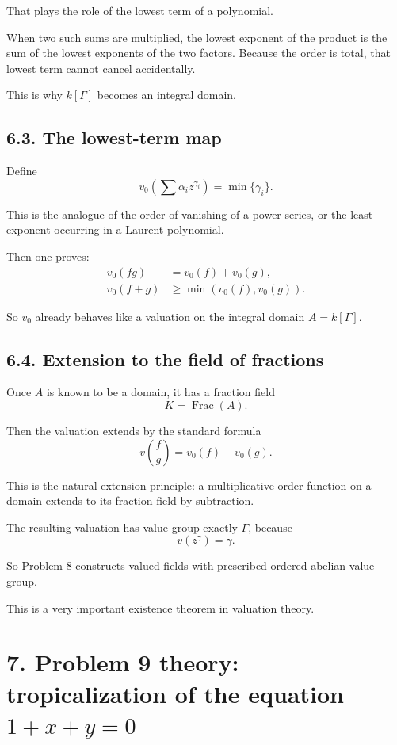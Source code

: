 \documentclass[12pt,a4paper]{article}
\theoremstyle{plain}
\theoremstyle{definition}      %
\begin{document}
That plays the role of the lowest term of a polynomial.

When two such sums are multiplied, the lowest exponent of the product is the sum of the lowest exponents of the two factors. Because the order is total, that lowest term cannot cancel accidentally.

This is why \(k[\Gamma]\) becomes an integral domain.

\subsection*{6.3. The lowest-term map}

Define
\[
v_0\left(\sum \alpha_i z^{\gamma_i}\right)=\min\{\gamma_i\}.
\]

This is the analogue of the order of vanishing of a power series, or the least exponent occurring in a Laurent polynomial.

Then one proves:
\begin{align*}
	v_0(fg)&=v_0(f)+v_0(g),\\
	v_0(f+g)&\ge \min(v_0(f),v_0(g)).
\end{align*}

So \(v_0\) already behaves like a valuation on the integral domain \(A=k[\Gamma]\).

\subsection*{6.4. Extension to the field of fractions}

Once \(A\) is known to be a domain, it has a fraction field
\[
K=\operatorname{Frac}(A).
\]

Then the valuation extends by the standard formula
\[
v\left(\frac{f}{g}\right)=v_0(f)-v_0(g).
\]

This is the natural extension principle:
a multiplicative order function on a domain extends to its fraction field by subtraction.

The resulting valuation has value group exactly \(\Gamma\), because
\[
v(z^\gamma)=\gamma.
\]

So Problem 8 constructs valued fields with prescribed ordered abelian value group.

This is a very important existence theorem in valuation theory.

\bigskip

\section*{7. Problem 9 theory: tropicalization of the equation \texorpdfstring{$1+x+y=0$}{1+x+y=0}}
\end{document}
